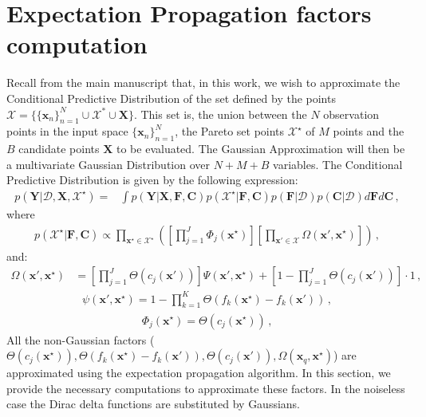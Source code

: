 \section{Expectation Propagation factors computation}

Recall from the main manuscript that, in this work, we wish to approximate the Conditional Predictive Distribution of the set defined by the points $\mathcal{X} = \{\{\boldsymbol{x}_n\}_{n=1}^{N} \cup \mathcal{X}^* \cup \boldsymbol{X}\}$. This set is, the union between the $N$ observation points in the input space $\{\boldsymbol{x}_n\}_{n=1}^{N}$, the Pareto set points $\mathcal{X}^\star$ of $M$ points and the $B$ candidate points $\mathbf{X}$ to be evaluated. The Gaussian Approximation will then be a multivariate Gaussian Distribution over $N+M+B$ variables. The Conditional Predictive Distribution is given by the following expression:
\begin{align}
p(\mathbf{Y}|\mathcal{D},\mathbf{X},\mathcal{X}^\star) = & 
        \int p(\mathbf{Y}|\mathbf{X},\mathbf{F},\mathbf{C}) p(\mathcal{X}^\star|\mathbf{F},\mathbf{C})
        p(\mathbf{F}|\mathcal{D}) p(\mathbf{C}|\mathcal{D}) d\mathbf{F} d \mathbf{C}\,,
        \label{eq:conditional_pred}
\end{align}
where
{\small
\begin{align}
p(\mathcal{X}^\star|\mathbf{F},\mathbf{C}) \propto 
        \prod_{\mathbf{x}^\star \in \mathcal{X}^\star}
        \left( \left[ \prod_{j=1}^J \Phi_j(\mathbf{x}^\star) \right] \left[ \prod_{\mathbf{x}'\in \mathcal{X}}
        \Omega(\mathbf{x}',\mathbf{x}^\star)\right]
        \right)\,,
        \label{eq:prob_pareto_set}
\end{align}}
and:
{\small
\begin{align}
\Omega(\mathbf{x}',\mathbf{x}^\star) &= \left[ \prod_{j=1}^J \Theta(c_j(\mathbf{x}')) \right]
\Psi(\mathbf{x}',\mathbf{x}^\star) + \left[1 - \prod_{j=1}^J \Theta(c_j(\mathbf{x}')) \right] \cdot 1\,,
\end{align}}
\begin{align}
\psi(\textbf{x}',\textbf{x}^{\star}) = 1 - \prod_{k=1}^K \Theta (f_k(\textbf{x}^{\star})-f_k(\textbf{x}'))\,,
\end{align}
\begin{align}
\Phi_j(\mathbf{x}^\star) = \Theta(c_j(\mathbf{x}^\star))\,,
\end{align}
All the non-Gaussian factors ($\Theta(c_j(\mathbf{x}^\star)), \Theta (f_k(\textbf{x}^{\star})-f_k(\textbf{x}')), \Theta(c_j(\mathbf{x}')), \Omega(\textbf{x}_q,\textbf{x}^{\star})$) are approximated using the expectation propagation algorithm. In this section, we provide the necessary computations to approximate these factors. In the noiseless case the Dirac delta functions are substituted by Gaussians.

